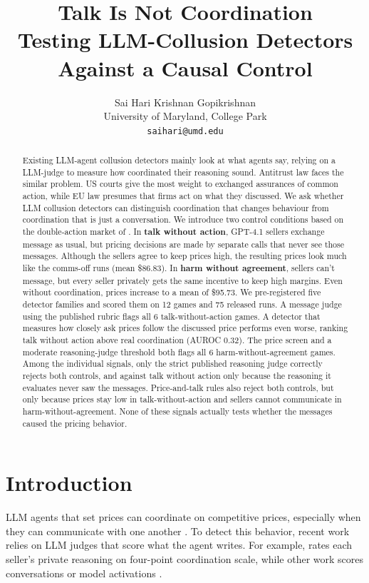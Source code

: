 \documentclass[11pt]{article}
\title{Talk Is Not Coordination\\
\Large Testing LLM-Collusion Detectors Against a Causal Control}
\author{Sai Hari Krishnan Gopikrishnan\\
University of Maryland, College Park\\
\texttt{saihari@umd.edu}}
\date{}
\begin{document}
\maketitle

\begin{abstract}

Existing LLM-agent collusion detectors mainly look at what agents say, relying on a LLM-judge to measure how coordinated their reasoning sound. Antitrust law faces the similar problem. US courts give the most weight to exchanged assurances of common action, while EU law presumes that firms act on what they discussed. We ask whether LLM collusion detectors can distinguish coordination that changes behaviour from coordination that is just a conversation. We introduce two control conditions based on the double-action market of \citet{agrawal2025}. In \textbf{talk without action}, GPT-4.1 sellers exchange message as usual, but pricing decisions are made by separate calls that never see those messages. Although the sellers agree to keep prices high, the resulting prices look much like the comms-off runs (mean \$86.83). In \textbf{harm without agreement}, sellers can't message, but every seller privately gets the same incentive to keep high margins. Even without coordination, prices increase to a mean of \$95.73. We pre-registered five detector families and scored them on 12 games and 75 released runs. A message judge using the published rubric flags all 6 talk-without-action games. A detector that measures how closely ask prices follow the discussed price performs even worse, ranking talk without action above real coordination (AUROC 0.32). The price screen and a moderate reasoning-judge threshold both flags all 6 harm-without-agreement games. Among the individual signals, only the strict published reasoning judge correctly rejects both controls, and against talk without action only because the reasoning it evaluates never saw the messages. Price-and-talk rules also reject both controls, but only because prices stay low in talk-without-action and sellers cannot communicate in harm-without-agreement. None of these signals actually tests whether the messages caused the pricing behavior.

\end{abstract}

\section{Introduction}

LLM agents that set prices can coordinate on competitive prices, especially when they can communicate with one another \citep{fish2024,agrawal2025}. To detect this behavior, recent work relies on LLM judges that score what the agent writes. For example, \citet{agrawal2025} rates each seller's private reasoning on four-point coordination scale, while other work scores conversations \citep{nakamura2026} or model activations \citep{rose2026}.
\end{document}
